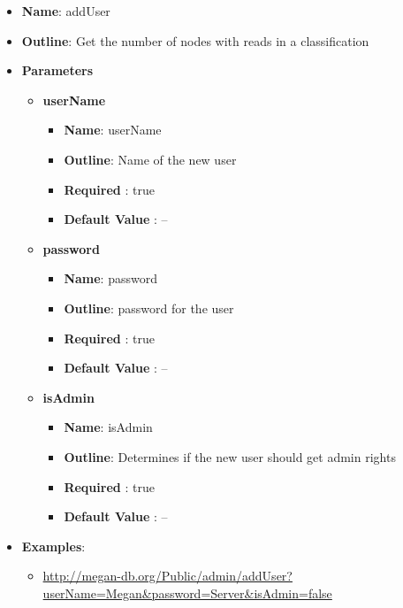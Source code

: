 \documentclass[11pt]{article}
\begin{document}
\begin{itemize}
	\item \textbf{Name}: addUser
	\item \textbf{Outline}: Get the number of nodes with reads in a classification
	\item \textbf{Parameters}
		\begin{itemize}
			\item \textbf{userName}
				\begin{itemize}
					\item \textbf{Name}: userName
					\item \textbf{Outline}: Name of the new user
					\item \textbf{Required} : true
					\item \textbf{Default Value} : --
				\end{itemize}
			\item \textbf{password}
				\begin{itemize}
					\item \textbf{Name}: password
					\item \textbf{Outline}: password for the user
					\item \textbf{Required} : true
					\item \textbf{Default Value} : --
				\end{itemize}
			\item \textbf{isAdmin}
				\begin{itemize}
					\item \textbf{Name}: isAdmin
					\item \textbf{Outline}: Determines if the new user should get admin rights
					\item \textbf{Required} : true
					\item \textbf{Default Value} : --
				\end{itemize}
		\end{itemize}
	\item \textbf{Examples}:
		\begin{itemize}
			\item \url{http://megan-db.org/Public/admin/addUser?userName=Megan&password=Server&isAdmin=false}
		\end{itemize}
\end{itemize}
\end{document}
